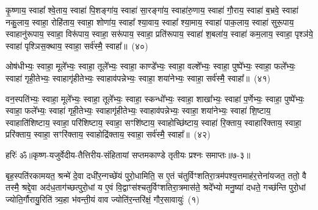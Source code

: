 कृ॒ष्णाय॒ स्वाहा᳚ श्वे॒ताय॒ स्वाहा॑ पि॒शङ्गा॑य॒ स्वाहा॑ सा॒रङ्गा॑य॒ स्वाहा॑रु॒णाय॒ स्वाहा॑ गौ॒राय॒ स्वाहा॑ ब॒भ्रवे॒ स्वाहा॑ नकु॒लाय॒ स्वाहा॒ रोहि॑ताय॒ स्वाहा॒ शोणा॑य॒ स्वाहा᳚ श्या॒वाय॒ स्वाहा᳚ श्या॒माय॒ स्वाहा॑ पाक॒लाय॒ स्वाहा॑ सुरू॒पाय॒ स्वाहानु॑रूपाय॒ स्वाहा॒ विरू॑पाय॒ स्वाहा॒ सरू॑पाय॒ स्वाहा॒ प्रति॑रूपाय॒ स्वाहा॑ श॒बला॑य॒ स्वाहा॑ कम॒लाय॒ स्वाहा॒ पृश्ञ॑ये॒ स्वाहा॑ पृश्ञिस॒क्थाय॒ स्वाहा॒ सर्व॑स्मै॒ स्वाहा᳚॥~(४०)\ip

{\anuvakamend[{कृ॒ष्णाय॒ षट्च॑त्वारिꣳशत्}]}%

ओष॑धीभ्यः॒ स्वाहा॒ मूले᳚भ्यः॒ स्वाहा॒ तूले᳚भ्यः॒ स्वाहा॒ काण्डे᳚भ्यः॒ स्वाहा॒ वल्\mbox{}शे᳚भ्यः॒ स्वाहा॒ पुष्पे᳚भ्यः॒ स्वाहा॒ फले᳚भ्यः॒ स्वाहा॑ गृही॒तेभ्यः॒ स्वाहागृ॑हीतेभ्यः॒ स्वाहाव॑पन्नेभ्यः॒ स्वाहा॒ शया॑नेभ्यः॒ स्वाहा॒ सर्व॑स्मै॒ स्वाहा᳚॥~(४१)\ip

{\anuvakamend[{ओष॑धीभ्य॒श्चतु॑र्विꣳशतिः}]}%

वन॒स्पति॑भ्यः॒ स्वाहा॒ मूले᳚भ्यः॒ स्वाहा॒ तूले᳚भ्यः॒ स्वाहा॒ स्कन्धो᳚भ्यः॒ स्वाहा॒ शाखा᳚भ्यः॒ स्वाहा॑ प॒र्णेभ्यः॒ स्वाहा॒ पुष्पे᳚भ्यः॒ स्वाहा॒ फले᳚भ्यः॒ स्वाहा॑ गृही॒तेभ्यः॒ स्वाहागृ॑हीतेभ्यः॒ स्वाहाव॑पन्नेभ्यः॒ स्वाहा॒ शया॑नेभ्यः॒ स्वाहा॑ शि॒ष्टाय॒ स्वाहाति॑शिष्टाय॒ स्वाहा॒ परि॑शिष्टाय॒ स्वाहा॒ सꣳशि॑ष्टाय॒ स्वाहोच्छि॑ष्टाय॒ स्वाहा॑ रि॒क्ताय॒ स्वाहारि॑क्ताय॒ स्वाहा॒ प्ररि॑क्ताय॒ स्वाहा॒ सꣳरि॑क्ताय॒ स्वाहोद्रि॑क्ताय॒ स्वाहा॒ सर्व॑स्मै॒ स्वाहा᳚॥~(४२)\ip

{\anuvakamend[{वन॒स्पति॑भ्यः॒ स्कन्धो᳚भ्यः शि॒ष्टाय॑ रि॒क्ताय॒ षट्च॑त्वारिꣳशत्}]}%

{हरिः॑ ॐ}{॥कृष्ण-यजुर्वेदीय-तैत्तिरीय-संहितायां सप्तमकाण्डे तृतीयः प्रश्नः समाप्तः॥७-३॥}



\setcounter{anuvakam}{0}
बृह॒स्पति॑रकामयत॒ श्रन्मे॑ दे॒वा दधी॑र॒न्गच्छे॑यं पुरो॒धामिति॒ स ए॒तं च॑तुर्विꣳशतिरा॒त्रम॑पश्य॒त्तमाह॑र॒त्तेना॑यजत॒ ततो॒ वै तस्मै॒ श्रद्दे॒वा अद॑ध॒ताग॑च्छत्पुरो॒धां य ए॒वं वि॒द्वाꣳस॑श्चतुर्विꣳशतिरा॒त्रमास॑ते॒ श्रदे᳚भ्यो मनु॒ष्या॑ दधते॒ गच्छ॑न्ति पुरो॒धां ज्योति॒र्गौरायु॒रिति॑ त्र्य॒हा भ॑वन्ती॒यं वाव ज्योति॑र॒न्तरि॑क्षं॒ गौर॒सावायुः॑~(१)\ip

